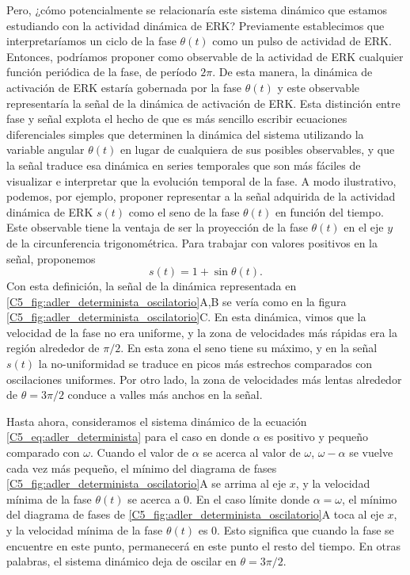 \documentclass[./main.tex]{subfiles}
\begin{document}
Pero, ¿cómo potencialmente se relacionaría este sistema dinámico que estamos estudiando con la actividad dinámica de ERK? Previamente establecimos que interpretaríamos un ciclo de la fase $\theta(t)$ como un pulso de actividad de ERK. Entonces, podríamos proponer como observable de la actividad de ERK cualquier función periódica de la fase, de período $2\pi$. De esta manera, la dinámica de activación de ERK estaría gobernada por la fase $\theta(t)$ y este observable representaría la señal de la dinámica de activación de ERK. Esta distinción entre fase y señal explota el hecho de que es más sencillo escribir ecuaciones diferenciales simples que determinen la dinámica del sistema utilizando la variable angular $\theta(t)$ en lugar de cualquiera de sus posibles observables, y que la señal traduce esa dinámica en series temporales que son más fáciles de visualizar e interpretar que la evolución temporal de la fase. A modo ilustrativo, podemos, por ejemplo, proponer representar a la señal adquirida de la actividad dinámica de ERK $s(t)$ como el seno de la fase $\theta(t)$ en función del tiempo. Este observable tiene la ventaja de ser la proyección de la fase $\theta(t)$ en el eje $y$ de la circunferencia trigonométrica. Para trabajar con valores positivos en la señal, proponemos 
\begin{equation}
    s(t) = 1+\sin{\theta(t)}.
    \label{C5_eq:seno_fase}
\end{equation}
Con esta definición, la señal de la dinámica representada en \ref{C5_fig:adler_determinista_oscilatorio}A,B se vería como en la figura \ref{C5_fig:adler_determinista_oscilatorio}C. En esta dinámica, vimos que la velocidad de la fase no era uniforme, y la zona de velocidades más rápidas era la región alrededor de $\pi/2$. En esta zona el seno tiene su máximo, y en la señal $s(t)$ la no-uniformidad se traduce en picos más estrechos comparados con oscilaciones uniformes. Por otro lado, la zona de velocidades más lentas alrededor de $\theta = 3 \pi/2$ conduce a valles más anchos en la señal. 


Hasta ahora, consideramos el sistema dinámico de la ecuación \ref{C5_eq:adler_determinista} para el caso en donde $\alpha$ es positivo y pequeño comparado con $\omega$. Cuando el valor de $\alpha$ se acerca al valor de $\omega$, $\omega - \alpha$ se vuelve cada vez más pequeño, el mínimo del diagrama de fases \ref{C5_fig:adler_determinista_oscilatorio}A se arrima al eje $x$, y la velocidad mínima de la fase $\theta(t)$ se acerca a $0$. En el caso límite donde $\alpha = \omega$, el mínimo del diagrama de fases de \ref{C5_fig:adler_determinista_oscilatorio}A toca al eje $x$, y la velocidad mínima de la fase $\theta(t)$ es $0$. Esto significa que cuando la fase se encuentre en este punto, permanecerá en este punto el resto del tiempo. En otras palabras, el sistema dinámico deja de oscilar en $\theta = 3 \pi/2$.
\end{document}
